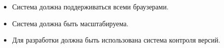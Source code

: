 
\begin{itemize}
    \item Система должна поддерживаться всеми браузерами.
    \item Система должна быть масштабируема.
    \item Для разработки должна быть использована система контроля версий.
\end{itemize}